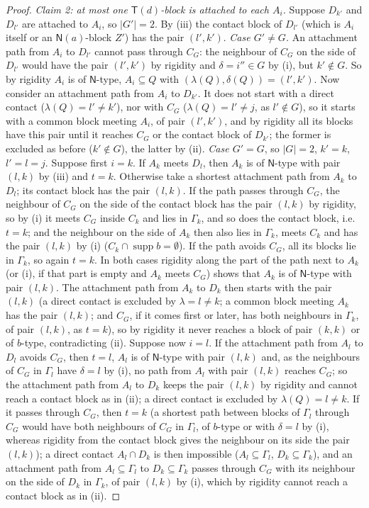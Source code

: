 \documentclass[11pt]{amsart}
\theoremstyle{definition}
\newcommand{\supp}{\operatorname{supp}}
\newcommand{\T}{\mathsf{T}}
\newcommand{\N}{\mathsf{N}}
\begin{document}
\begin{proof}
\emph{Claim 2: at most one $\T(d)$-block is attached to each $A_i$.} Suppose $D_{k'}$ and $D_{l'}$ are attached to $A_i$, so $|G'|=2$. By (iii) the contact block of $D_{l'}$ (which is $A_i$ itself or an $\N(a)$-block $Z'$) has the pair $(l',k')$. \emph{Case $G'\ne G$.} An attachment path from $A_i$ to $D_{l'}$ cannot pass through $C_G$: the neighbour of $C_G$ on the side of $D_{l'}$ would have the pair $(l',k')$ by rigidity and $\delta=i''\in G$ by (i), but $k'\notin G$. So by rigidity $A_i$ is of $\N$-type, $A_i\subseteq Q$ with $(\lambda(Q),\delta(Q))=(l',k')$. Now consider an attachment path from $A_i$ to $D_{k'}$. It does not start with a direct contact ($\lambda(Q)=l'\ne k'$), nor with $C_G$ ($\lambda(Q)=l'\ne j$, as $l'\notin G$), so it starts with a common block meeting $A_i$, of pair $(l',k')$, and by rigidity all its blocks have this pair until it reaches $C_G$ or the contact block of $D_{k'}$; the former is excluded as before ($k'\notin G$), the latter by (ii). \emph{Case $G'=G$}, so $|G|=2$, $k'=k$, $l'=l=j$. Suppose first $i=k$. If $A_k$ meets $D_l$, then $A_k$ is of $\N$-type with pair $(l,k)$ by (iii) and $t=k$. Otherwise take a shortest attachment path from $A_k$ to $D_l$; its contact block has the pair $(l,k)$. If the path passes through $C_G$, the neighbour of $C_G$ on the side of the contact block has the pair $(l,k)$ by rigidity, so by (i) it meets $C_G$ inside $C_k$ and lies in $\Gamma_k$, and so does the contact block, i.e.\ $t=k$; and the neighbour on the side of $A_k$ then also lies in $\Gamma_k$, meets $C_k$ and has the pair $(l,k)$ by (i) ($C_k\cap\supp b=\emptyset$). If the path avoids $C_G$, all its blocks lie in $\Gamma_k$, so again $t=k$. In both cases rigidity along the part of the path next to $A_k$ (or (i), if that part is empty and $A_k$ meets $C_G$) shows that $A_k$ is of $\N$-type with pair $(l,k)$. The attachment path from $A_k$ to $D_k$ then starts with the pair $(l,k)$ (a direct contact is excluded by $\lambda=l\ne k$; a common block meeting $A_k$ has the pair $(l,k)$; and $C_G$, if it comes first or later, has both neighbours in $\Gamma_k$, of pair $(l,k)$, as $t=k$), so by rigidity it never reaches a block of pair $(k,k)$ or of $b$-type, contradicting (ii). Suppose now $i=l$. If the attachment path from $A_l$ to $D_l$ avoids $C_G$, then $t=l$, $A_l$ is of $\N$-type with pair $(l,k)$ and, as the neighbours of $C_G$ in $\Gamma_l$ have $\delta=l$ by (i), no path from $A_l$ with pair $(l,k)$ reaches $C_G$; so the attachment path from $A_l$ to $D_k$ keeps the pair $(l,k)$ by rigidity and cannot reach a contact block as in (ii); a direct contact is excluded by $\lambda(Q)=l\ne k$. If it passes through $C_G$, then $t=k$ (a shortest path between blocks of $\Gamma_l$ through $C_G$ would have both neighbours of $C_G$ in $\Gamma_l$, of $b$-type or with $\delta=l$ by (i), whereas rigidity from the contact block gives the neighbour on its side the pair $(l,k)$); a direct contact $A_l\cap D_k$ is then impossible ($A_l\subseteq\Gamma_l$, $D_k\subseteq\Gamma_k$), and an attachment path from $A_l\subseteq\Gamma_l$ to $D_k\subseteq\Gamma_k$ passes through $C_G$ with its neighbour on the side of $D_k$ in $\Gamma_k$, of pair $(l,k)$ by (i), which by rigidity cannot reach a contact block as in (ii).


\end{proof}
\end{document}
